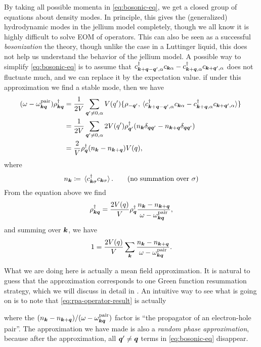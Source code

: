 \documentclass[hyperref, a4paper]{article}
\begin{document}
By taking all possible momenta in \eqref{eq:bosonic-eq}, we get a closed group of equations about density 
modes. In principle, this gives the (generalized) hydrodynamic modes in the jellium model completely, 
though we all know it is highly difficult to solve EOM of operators. This can also be seen as a successful 
\emph{bosonization} the theory, though unlike the case in a Luttinger liquid, this does not help us understand
the behavior of the jellium model. A possible way to simplify 
\eqref{eq:bosonic-eq} is to assume that $c^\dagger_{\vb*{k} + \vb*{q} - \vb*{q}' , \alpha} c_{\vb*{k} \alpha} 
- c^\dagger_{\vb*{k} + \vb*{q}, \alpha} c_{\vb*{k} + \vb*{q}', \alpha}$ does not fluctuate much, and we 
can replace it by the expectation value. if under this approximation we find a stable mode, 
then we have 
\[
    \begin{aligned}
        (\omega - \omega_{\vb*{k} \vb*{q}}^\text{pair}) \rho^\dagger_{\vb*{k} \vb*{q}} &= \frac{1}{2V} \sum_{\vb*{q}' \neq 0, \alpha} V(q') \acomm*{\rho_{-\vb*{q}'}}{\expval*{c^\dagger_{\vb*{k} + \vb*{q} - \vb*{q}' , \alpha} c_{\vb*{k} \alpha} - c^\dagger_{\vb*{k} + \vb*{q}, \alpha} c_{\vb*{k} + \vb*{q}', \alpha}}} \\
        &= \frac{1}{2V} \sum_{\vb*{q}' \neq 0, \alpha} 2 V(q') \rho_{\vb*{q}'}^\dagger (n_{\vb*{k}} \delta_{\vb*{q} \vb*{q}'} - n_{\vb*{k} + \vb*{q}} \delta_{\vb*{q} \vb*{q}'}) \\
        &= \frac{2}{V} \rho^\dagger_{\vb*{q}} (n_{\vb*{k}} - n_{\vb*{k} + \vb*{q}}) V(q),
    \end{aligned}
\] 
where 
\begin{equation}
    n_{\vb*{k}} \coloneqq \expval*{c^\dagger_{\vb*{k} \sigma} c_{\vb*{k} \sigma}}. \quad \quad (\text{no summation over $\sigma$})
\end{equation}
From the equation above we find 
\begin{equation}
    \rho_{\vb*{k} \vb*{q}}^\dagger = \frac{2 V(q)}{V} \rho^\dagger_{\vb*{q}} \frac{n_{\vb*{k}} - n_{\vb*{k} + \vb*{q}}}{\omega - \omega_{\vb*{k} \vb*{q}}^\text{pair}},
    \label{eq:rpa-operator-result}
\end{equation}
and summing over $\vb*{k}$, we have 
\begin{equation}
    1 = \frac{2 V(q)}{V} \sum_{\vb*{k}} \frac{n_{\vb*{k}} - n_{\vb*{k} + \vb*{q}}}{\omega - \omega_{\vb*{k} \vb*{q}}^\text{pair}}.
    \label{eq:freq-eq}
\end{equation}

What we are doing here is actually a mean field approximation. 
It is natural to guess that the approximation corresponds to one Green function resummation strategy, 
which we will discuss in detail in .
An intuitive way to see what is going on is to note that \eqref{eq:rpa-operator-result} is actually

where the $(n_{\vb*{k}} - n_{\vb*{k} + \vb*{q}}) / (\omega - \omega_{\vb*{k} \vb*{q}}^\text{pair})$
factor is ``the propagator of an electron-hole pair''. The approximation we have made is also 
a \emph{random phase approximation}, because after the approximation, all $\vb*{q}' \neq \vb*{q}$
terms in \eqref{eq:bosonic-eq} disappear. 
\end{document}
